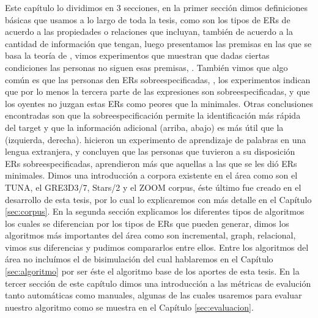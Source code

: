Este cap\'itulo lo dividimos en 3 secciones, en la primer secci\'on dimos definiciones b\'asicas que usamos a lo largo de toda la tesis, 
como son los tipos de ERs de acuerdo a las propiedades o relaciones que incluyan, tambi\'en de acuerdo a la cantidad de informaci\'on que 
tengan, luego presentamos las premisas en las que se basa la teor\'ia de \cite{clark1992arenas,clark96,Clark-Marshall81}, vimos experimentos que muestran que dadas ciertas condiciones las personas no siguen esas premisas, 
\cite{keysar:Curr98}. Tambi\'en vimos que algo com\'un es que las personas den ERs sobreespecificadas, \cite{arts,Engelhardt_Bailey_Ferreira_2006}, los experimentos 
indican que por lo menos la tercera parte de las expresiones son sobreespecificadas, y que los oyentes no juzgan estas ERs como peores que 
la minimales. Otras conclusiones encontradas son que la sobreespecificaci\'on permite la identificaci\'on m\'as r\'apida del target y que la 
informaci\'on adicional (arriba, abajo) es m\'as \'util que la (izquierda, derecha). \cite{Lu_sasha2015} hicieron un experimento de 
aprendizaje de palabras en una lengua extranjera, y concluyen que las personas que tuvieron a su disposici\'on ERs sobreespecificadas, 
aprendieron m\'as que aquellas a las que se les di\'o ERs minimales. Dimos una introducci\'on a corpora existente en el \'area 
como son el TUNA, el GRE3D3/7, Stars/2 y el ZOOM corpus, \'este \'ultimo fue creado en el desarrollo de esta tesis, por lo cual lo explicaremos con m\'as detalle en el Cap\'itulo \ref{sec:corpus}. En la segunda secci\'on explicamos los diferentes tipos de algoritmos los cuales se 
diferencian por los tipos de ERs que pueden generar, dimos los algoritmos m\'as importantes del \'area como son incremental, graph, relacional, vimos sus diferencias y pudimos compararlos entre ellos. Entre los algoritmos del \'area no inclu\'imos el de 
bisimulaci\'on del cual hablaremos en el Cap\'itulo \ref{sec:algoritmo} por ser \'este el algoritmo base de los aportes de esta tesis. En la tercer secci\'on de este cap\'itulo dimos una introducci\'on a las m\'etricas de evaluci\'on tanto autom\'aticas como manuales, algunas de las cuales usaremos para evaluar nuestro algoritmo como se muestra en el Cap\'itulo \ref{sec:evaluacion}.


